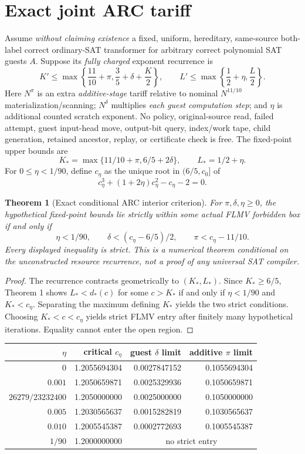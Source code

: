 \documentclass[10pt]{article}
\newtheorem{theorem}{Theorem}
\begin{document}
\section{Exact joint ARC tariff}
Assume \emph{without claiming existence} a fixed, uniform, hereditary, same-source both-label correct ordinary-SAT transformer for arbitrary correct polynomial SAT guests $A$. Suppose its \emph{fully charged} exponent recurrence is
\[
K'\le \max\left\{\frac{11}{10}+\pi,\frac35+\delta+\frac K2\right\},
\qquad L'\le\max\left\{\frac12+\eta,\frac L2\right\}.
\]
Here $N^\pi$ is an extra \emph{additive-stage} tariff relative to nominal $N^{11/10}$ materialization/scanning; $N^\delta$ multiplies \emph{each guest computation step}; and $\eta$ is additional counted scratch exponent. No policy, original-source read, failed attempt, guest input-head move, output-bit query, index/work tape, child generation, retained ancestor, replay, or certificate check is free. The fixed-point upper bounds are
\[
K_*=\max\{11/10+\pi,6/5+2\delta\},\qquad L_*=1/2+\eta.
\]
For $0\le\eta<1/90$, define $c_\eta$ as the unique root in $(6/5,c_0]$ of
\[
\boxed{c_\eta^3+(1+2\eta)c_\eta^2-c_\eta-2=0.}
\]
\begin{theorem}[Exact conditional ARC interior criterion]
For $\pi,\delta,\eta\ge0$, the hypothetical fixed-point bounds lie strictly within \emph{some} actual FLMV forbidden box if and only if
\[
\boxed{\eta<1/90,\qquad\delta<(c_\eta-6/5)/2,\qquad
\pi<c_\eta-11/10.}
\]
Every displayed inequality is strict. This is a numerical theorem \emph{conditional on the unconstructed resource recurrence}, not a proof of any universal SAT compiler.
\end{theorem}
\begin{proof}
The recurrence contracts geometrically to $(K_*,L_*)$. Since $K_*\ge6/5$, Theorem 1 shows $L_*<d_*(c)$ for some $c>K_*$ if and only if $\eta<1/90$ and $K_*<c_\eta$. Separating the maximum defining $K_*$ yields the two strict conditions. Choosing $K_*<c<c_\eta$ yields strict FLMV entry after finitely many hypothetical iterations. Equality cannot enter the open region.
\end{proof}
\begin{center}\begin{tabular}{rrrr}\toprule
$\eta$&critical $c_\eta$&guest $\delta$ limit&additive $\pi$ limit\\\midrule
$0$&1.2055694304&0.0027847152&0.1055694304\\
$0.001$&1.2050659871&0.0025329936&0.1050659871\\
$26279/23232400$&1.2050000000&0.0025000000&0.1050000000\\
$0.005$&1.2030565637&0.0015282819&0.1030565637\\
$0.010$&1.2005545387&0.0002772693&0.1005545387\\
$1/90$&1.2000000000&\multicolumn{2}{c}{no strict entry}\\\bottomrule
\end{tabular}\end{center}
\end{document}
